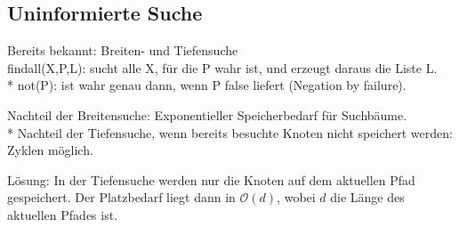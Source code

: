 \documentclass[a4paper]{scrartcl}
\begin{document}
\subsection{Uninformierte Suche}
Bereits bekannt: Breiten- und Tiefensuche\\
findall(X,P,L): sucht alle X, für die P wahr ist, und erzeugt daraus die Liste L.\\*
not(P): ist wahr genau dann, wenn P false liefert (Negation by failure).

Nachteil der Breitensuche: Exponentieller Speicherbedarf für Suchbäume.\\*
Nachteil der Tiefensuche, wenn bereits besuchte Knoten nicht speichert werden: Zyklen möglich.

Lösung: In der Tiefensuche werden nur die Knoten auf dem aktuellen Pfad gespeichert. Der Platzbedarf liegt dann in $\mathcal{O}(d)$, wobei $d$ die Länge des aktuellen Pfades ist.
\end{document}
